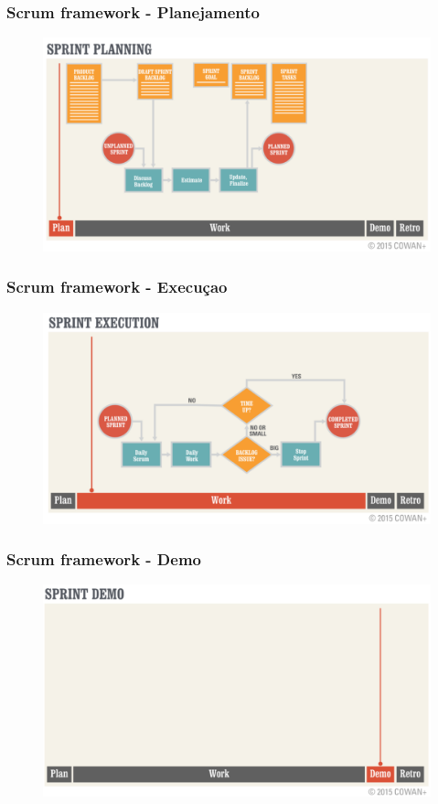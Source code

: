 \begin{frame}
 \frametitle{Scrum framework -  Planejamento}
  \begin{figure}
   \centering
   \includegraphics[width =\textwidth]{figs/fases_sprint_planning.png}
  \end{figure}
\end{frame}

\begin{frame}
 \frametitle{Scrum framework -  Execuçao}
  \begin{figure}
   \centering
   \includegraphics[width = \textwidth]{figs/fases_sprint_execution.png}
  \end{figure}
\end{frame}

\begin{frame}
 \frametitle{Scrum framework -  Demo}
  \begin{figure}
   \centering
   \includegraphics[width = \textwidth]{figs/fases_sprint_demo.png}
  \end{figure}
\end{frame}

